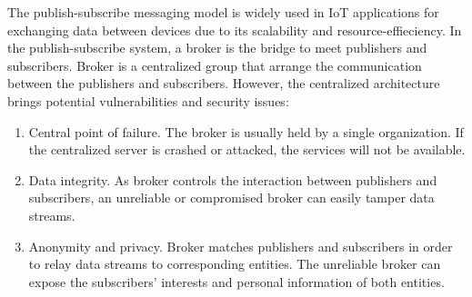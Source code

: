 The publish-subscribe messaging model is widely used in IoT applications for exchanging data between devices due to its scalability and resource-effieciency. In the publish-subscribe system, a broker is the bridge to meet publishers and subscribers. Broker is a centralized group that arrange the communication between the publishers and subscribers. However, the centralized architecture brings potential vulnerabilities and security issues:

\begin{enumerate}
	\item Central point of failure. 
	The broker is usually held by a single organization. If the centralized server is crashed or attacked, the services will not be available. 	
	\item Data integrity.
	As broker controls the interaction between publishers and subscribers, an unreliable or compromised broker can easily tamper data streams. 
	\item Anonymity and privacy.
	Broker matches publishers and subscribers in order to relay data streams to corresponding entities. The unreliable broker can expose the subscribers' interests and personal information of both entities.  
\end{enumerate}